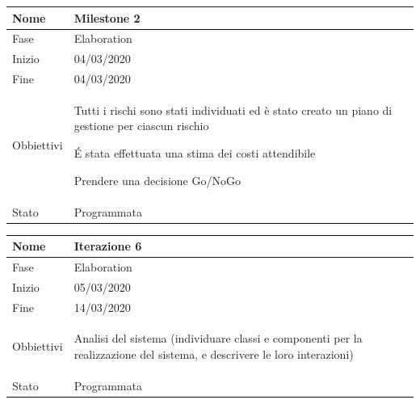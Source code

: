 \begin{center}
\begin{tabular}{ |p{2cm}|p{10cm}|  }
\hline
Nome & Milestone 2\\\hline
Fase & Elaboration \\\hline
Inizio & 04/03/2020 \\\hline
Fine &  04/03/2020 \\\hline
Obbiettivi & 
	\begin{compactitem}
		\item Tutti i rischi sono stati individuati ed è stato creato un piano di gestione per ciascun rischio
		\item \'E stata effettuata una stima dei costi attendibile
		\item Prendere una decisione Go/NoGo
	\end{compactitem}\\\hline
Stato &  Programmata \\\hline
\end{tabular}
\label{table:milestone2}\newline

\begin{tabular}{ |p{2cm}|p{10cm}|  }
\hline
Nome & Iterazione 6 \\\hline
Fase & Elaboration \\\hline
Inizio & 05/03/2020 \\\hline
Fine &  14/03/2020  \\\hline
Obbiettivi & 
	\begin{compactitem}
		\item Analisi del sistema (individuare classi e componenti per la realizzazione del sistema, e descrivere le loro interazioni)
	\end{compactitem}\\\hline
Stato &  Programmata \\\hline
\end{tabular}
\label{table:6}\newline


\end{center}
